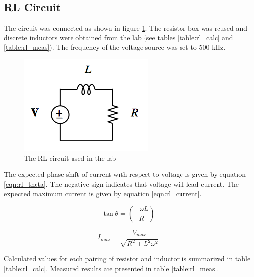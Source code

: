 \documentclass[12pt]{article}
\begin{document}
\subsection{RL Circuit}\label{sec:rl}
The circuit was connected as shown in figure \ref{fig:rl}. The resistor box was reused and discrete inductors were obtained from the lab (see tables \ref{table:rl_calc} and \ref{table:rl_meas}). The frequency of the voltage source was set to 500 kHz.

\begin{figure}[h]
	\centering
	\includegraphics[scale=0.6]{RL_circuit}
	\caption{The RL circuit used in the lab}
	\label{fig:rl}
\end{figure}

The expected phase shift of current with respect to voltage is given by equation \eqref{eqn:rl_theta}. The negative sign indicates that voltage will lead current. The expected maximum current is given by equation \eqref{eqn:rl_current}.

\begin{equation}
	\tan { \theta  } =\left( \frac { -\omega L }{ R }  \right) 
	\label{eqn:rl_theta}
\end{equation}

\begin{equation}
		I_{max} = \frac{V_{max}}{\sqrt{R^2 + L^2\omega^2}}
		\label{eqn:rl_current}
\end{equation}

\pagebreak
Calculated values for each pairing of resistor and inductor is summarized in table \ref{table:rl_calc}. Measured results are presented in table \ref{table:rl_meas}.
\end{document}
